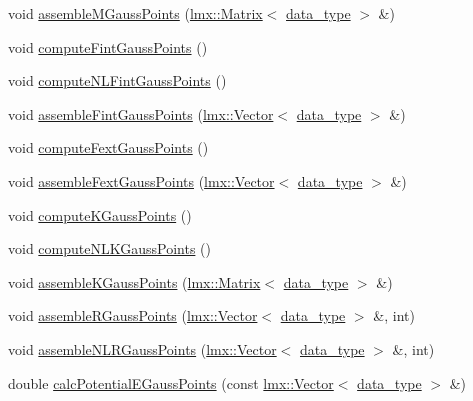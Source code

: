 \begin{DoxyCompactItemize}
\item 
void \hyperlink{classmknix_1_1_cell_a0b44063103766cd26b0411156c6d6004}{assemble\+M\+Gauss\+Points} (\hyperlink{classlmx_1_1_matrix}{lmx\+::\+Matrix}$<$ \hyperlink{namespacemknix_a16be4b246fbf2cceb141e3a179111020}{data\+\_\+type} $>$ \&)
\item 
void \hyperlink{classmknix_1_1_cell_a1c3123f613acd57332a6e84dc3736b86}{compute\+Fint\+Gauss\+Points} ()
\item 
void \hyperlink{classmknix_1_1_cell_a84014b9ed9c8a49c604f4ddb91b524fe}{compute\+N\+L\+Fint\+Gauss\+Points} ()
\item 
void \hyperlink{classmknix_1_1_cell_a1bf285b7dd7f06ece2f92e2b4389d6f5}{assemble\+Fint\+Gauss\+Points} (\hyperlink{classlmx_1_1_vector}{lmx\+::\+Vector}$<$ \hyperlink{namespacemknix_a16be4b246fbf2cceb141e3a179111020}{data\+\_\+type} $>$ \&)
\item 
void \hyperlink{classmknix_1_1_cell_a19b4ed719612fe2e0043d0cebcbe1537}{compute\+Fext\+Gauss\+Points} ()
\item 
void \hyperlink{classmknix_1_1_cell_a7c381e6cbcdb2478505645cad57a2c6e}{assemble\+Fext\+Gauss\+Points} (\hyperlink{classlmx_1_1_vector}{lmx\+::\+Vector}$<$ \hyperlink{namespacemknix_a16be4b246fbf2cceb141e3a179111020}{data\+\_\+type} $>$ \&)
\item 
void \hyperlink{classmknix_1_1_cell_a379600644881412c03608d3d32c36d49}{compute\+K\+Gauss\+Points} ()
\item 
void \hyperlink{classmknix_1_1_cell_a56231c1df8cd13f6b3f04356da6c2955}{compute\+N\+L\+K\+Gauss\+Points} ()
\item 
void \hyperlink{classmknix_1_1_cell_a8b703b97535562245382523c3702a054}{assemble\+K\+Gauss\+Points} (\hyperlink{classlmx_1_1_matrix}{lmx\+::\+Matrix}$<$ \hyperlink{namespacemknix_a16be4b246fbf2cceb141e3a179111020}{data\+\_\+type} $>$ \&)
\item 
void \hyperlink{classmknix_1_1_cell_a97fdd8bbf158f3b03b1af601177c2585}{assemble\+R\+Gauss\+Points} (\hyperlink{classlmx_1_1_vector}{lmx\+::\+Vector}$<$ \hyperlink{namespacemknix_a16be4b246fbf2cceb141e3a179111020}{data\+\_\+type} $>$ \&, int)
\item 
void \hyperlink{classmknix_1_1_cell_af65d528a607f3215d04449551db94dcd}{assemble\+N\+L\+R\+Gauss\+Points} (\hyperlink{classlmx_1_1_vector}{lmx\+::\+Vector}$<$ \hyperlink{namespacemknix_a16be4b246fbf2cceb141e3a179111020}{data\+\_\+type} $>$ \&, int)
\item 
double \hyperlink{classmknix_1_1_cell_a9aba982ff2a54738ec8b38446d333f8d}{calc\+Potential\+E\+Gauss\+Points} (const \hyperlink{classlmx_1_1_vector}{lmx\+::\+Vector}$<$ \hyperlink{namespacemknix_a16be4b246fbf2cceb141e3a179111020}{data\+\_\+type} $>$ \&)

\end{DoxyCompactItemize}
